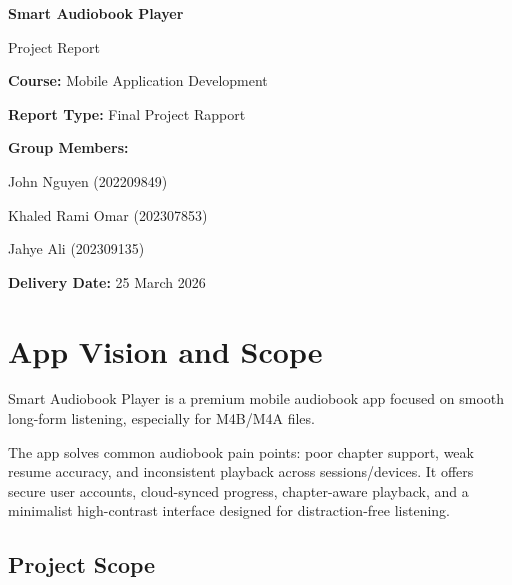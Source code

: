 \documentclass[11pt,a4paper]{article}
\begin{document}
\begin{titlepage}
    \centering
    \vspace*{2cm}

    {\Huge\bfseries Smart Audiobook Player\par}
    \vspace{0.5cm}
    {\Large Project Report\par}
    \vspace{2cm}

    {\large
    \textbf{Course:} Mobile Application Development\par
    \vspace{0.5cm}
    \textbf{Report Type:} Final Project Rapport\par
    \vspace{1cm}

    \textbf{Group Members:}\par
    \vspace{0.3cm}
    John Nguyen (202209849)\par
    Khaled Rami Omar (202307853)\par
    Jahye Ali (202309135)\par
    \vspace{1cm}

    \textbf{Delivery Date:} 25 March 2026\par
    }

    \vfill
\end{titlepage}

\tableofcontents
\clearpage

\section{App Vision and Scope}

Smart Audiobook Player is a premium mobile audiobook app focused on smooth long-form listening, especially for M4B/M4A files.

The app solves common audiobook pain points: poor chapter support, weak resume accuracy, and inconsistent playback across sessions/devices. It offers secure user accounts, cloud-synced progress, chapter-aware playback, and a minimalist high-contrast interface designed for distraction-free listening.

\subsection{Project Scope}
\end{document}
